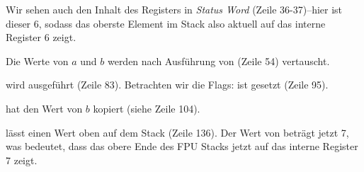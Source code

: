 Wir sehen auch den Inhalt des  Registers in \emph{Status Word} (Zeile
36-37)--hier ist dieser 6, sodass das oberste Element im Stack also aktuell auf das
interne Register 6 zeigt.

Die Werte von $a$ und $b$ werden nach Ausführung von  (Zeile 54)
vertauscht.

 wird ausgeführt (Zeile 83).
Betrachten wir die Flags: \CF ist gesetzt (Zeile 95).

 hat den Wert von $b$ kopiert (siehe Zeile 104).

\FSTP lässt einen Wert oben auf dem Stack (Zeile 136).
Der Wert von  beträgt jetzt 7, was bedeutet, dass das obere Ende des
FPU Stacks jetzt auf das interne Register 7 zeigt.
